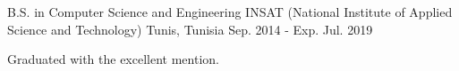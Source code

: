

\begin{cventries}

  \cventry
    {B.S. in Computer Science and Engineering} %
    {INSAT (National Institute of Applied Science and Technology)} %
    {Tunis, Tunisia} %
    {Sep. 2014 - Exp. Jul. 2019} %
    {
      \begin{cvitems} %
        \item {Graduated with the excellent mention.}
      \end{cvitems}
    }

\end{cventries}
